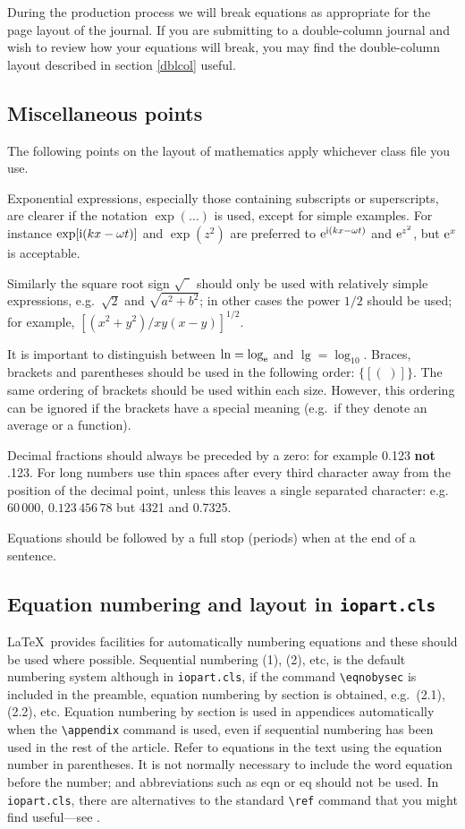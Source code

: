 \documentclass[12pt]{iopart}
\begin{document}
During the production process we will break equations as appropriate for the page layout of the journal. If you are submitting to a double-column journal and wish to review how your equations will break, you may find the double-column layout described in section \ref{dblcol} useful.
 
\subsection{Miscellaneous points}
The following points on the layout of mathematics apply whichever class file you use.

Exponential expressions, especially those containing subscripts or 
superscripts, are clearer if the notation $\exp(\ldots)$ is used, except for 
simple examples. For instance $\exp[\mathrm{i}(kx-\omega t)]$ and $\exp(z^2)$ are 
preferred to $\mathrm{e}^{\mathrm{i}(kx-\omega t)}$ and $\mathrm{e}^{z^2}$, but 
$\mathrm{e}^x$ 
is acceptable. 

Similarly the square root sign $\sqrt{\phantom{b}}$ should 
only be used with relatively
simple expressions, e.g.\ $\sqrt2$ and $\sqrt{a^2+b^2}$;
in other cases the 
power $1/2$ should be used; for example, $[(x^2+y^2)/xy(x-y)]^{1/2}$.

It is important to distinguish between $\ln = \log_{\mathrm{e}}$ and $\lg 
=\log_{10}$. Braces, brackets and parentheses should be used in the 
following order: $\{[(\;)]\}$. The same ordering of brackets should be 
used within each size. However, this ordering can be ignored if the
brackets have a 
special meaning (e.g.\ if they denote an average or a function).  

Decimal fractions should always be preceded by a zero: for example 0.123 {\bf not} .123.
For long numbers use thin spaces after every third character away from the position of the decimal point, unless 
this leaves a single separated character: e.g.\ $60\,000$, $0.123\,456\,78$ 
but 4321 and 0.7325.

Equations should be followed by a full stop (periods) when at the end
of a sentence.

\subsection{Equation numbering and layout in {\tt iopart.cls}}
\label{eqnum}
\LaTeX\ provides facilities for automatically numbering equations 
and these should be used where possible. Sequential numbering (1), (2), 
etc, is the default numbering system although in \verb"iopart.cls", if the command
\verb"\eqnobysec" is included in the preamble, equation numbering
by section is obtained, e.g.\ 
(2.1), (2.2), etc. Equation numbering by section is used in appendices automatically when the \verb"\appendix" command is used, even if sequential numbering has been used in the rest of the article. 
Refer to equations in the text using the equation number in parentheses. It is not normally necessary to include the word equation before the number; and abbreviations such as eqn or eq should not be used.
In \verb"iopart.cls", there are alternatives to the standard \verb"\ref" command that you might
find useful---see \tref{abrefs}.
\end{document}
